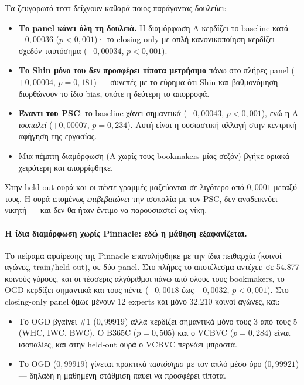 \documentclass[11pt,a4paper]{article}
\renewcommand{\_}{\oldunderscore\allowbreak}
\begin{document}
Τα ζευγαρωτά τεστ δείχνουν καθαρά ποιος παράγοντας δουλεύει:

\begin{itemize}
  \item \textbf{Το panel κάνει όλη τη δουλειά.} Η διαμόρφωση A κερδίζει το baseline κατά
        $-0{,}00036$ ($p<0{,}001$)· το closing-only με απλή κανονικοποίηση κερδίζει σχεδόν
        ταυτόσημα ($-0{,}00034$, $p<0{,}001$).
  \item \textbf{Το Shin μόνο του δεν προσφέρει τίποτα μετρήσιμο} πάνω στο πλήρες panel
        ($+0{,}00004$, $p=0{,}181$) --- συνεπές με το εύρημα ότι Shin και βαθμονόμηση
        διορθώνουν το ίδιο bias, οπότε η δεύτερη το απορροφά.
  \item \textbf{Έναντι του PSC}: το baseline χάνει σημαντικά ($+0{,}00043$, $p<0{,}001$),
        ενώ η A \emph{ισοπαλεί} ($+0{,}00007$, $p=0{,}234$). Αυτή είναι η ουσιαστική αλλαγή
        στην κεντρική αφήγηση της εργασίας.
  \item Μια πέμπτη διαμόρφωση (A χωρίς τους bookmakers μίας σεζόν) βγήκε οριακά χειρότερη
        και απορρίφθηκε.
\end{itemize}

Στην held-out ουρά και οι πέντε γραμμές μαζεύονται σε λιγότερο από $0{,}0001$ μεταξύ τους.
Η ουρά επομένως \emph{επιβεβαιώνει} την ισοπαλία με τον PSC, δεν αναδεικνύει νικητή --- και
δεν θα ήταν έντιμο να παρουσιαστεί ως νίκη.

\paragraph{Η ίδια διαμόρφωση χωρίς Pinnacle: εδώ η μάθηση εξαφανίζεται.} Το πείραμα αφαίρεσης
της Pinnacle επαναλήφθηκε με την ίδια πειθαρχία (κοινοί αγώνες, train/held-out), σε δύο
panel. Στο πλήρες το αποτέλεσμα αντέχει: σε 54.877 κοινούς γύρους, και οι τέσσερις
αλγόριθμοι πάνω από όλους τους bookmakers, το OGD κερδίζει σημαντικά και τους πέντε
($-0{,}0018$ έως $-0{,}0032$, $p<0{,}001$). Στο closing-only panel όμως μένουν 12 experts και
μόνο 32.210 κοινοί αγώνες, και:

\begin{itemize}
  \item Το OGD βγαίνει \#1 ($0{,}99919$) αλλά κερδίζει σημαντικά μόνο τους 3 από τους 5
        (WHC, IWC, BWC). Ο B365C ($p=0{,}505$) και ο VC\_BVC ($p=0{,}284$) είναι ισοπαλίες,
        και στην held-out ουρά ο VC\_BVC περνάει μπροστά.
  \item Το OGD ($0{,}99919$) γίνεται πρακτικά \emph{ταυτόσημο} με τον απλό μέσο όρο
        ($0{,}99921$) --- δηλαδή η μαθημένη στάθμιση παύει να προσφέρει τίποτα.
\end{itemize}
\end{document}

